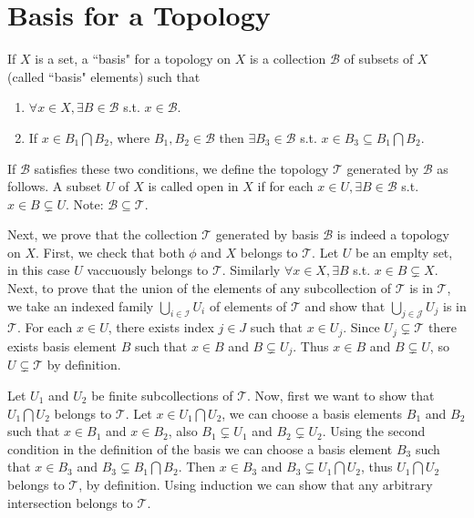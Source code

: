 \documentclass[a4paper,english,12pt]{article}   	%
\begin{document}
\section{Basis for a Topology}
\begin{defn}
 If $X$ is a set, a ``basis" for a topology on $X$ is a collection $\mathcal{B}$ of subsets of $X$ (called ``basis" elements) such that 
 \begin{enumerate}
  \item $\forall x\in X, \exists B\in \mathcal{B}$ s.t. $x\in \mathcal{B}$.
  \item If $x\in B_1\bigcap B_2$, where $B_1, B_2 \in \mathcal{B}$ then $\exists B_3 \in \mathcal{B}$ s.t. $x\in B_3\subseteq B_1\bigcap B_2$.
 \end{enumerate}
\end{defn}
 If $\mathcal{B}$ satisfies these two conditions, we define the topology $\mathcal{T}$ generated by $\mathcal{B}$ as follows. A subset $U$ of $X$ is called open in $X$ if for each $x\in U, \exists B\in \mathcal{B}$ s.t. $x\in B\varsubsetneq U$. 
 Note: $\mathcal{B}\subseteq\mathcal{T}$.
 
 Next, we prove that the collection $\mathcal{T}$ generated by basis $\mathcal{B}$ is indeed a topology on $X$. First, we check that both $\phi$ and $X$ belongs to $\mathcal{T}$. Let $U$ be an emplty set, in this case $U$ vaccuously belongs to $\mathcal{T}$. Similarly $\forall x\in X, \exists B$ s.t. $x\in B\varsubsetneq X$. Next, to prove that the union of the elements of any subcollection of $\mathcal{T}$ is in $\mathcal{T}$, we take an indexed family $\bigcup_{i\in \mathcal{I}}U_i$ of elements of $\mathcal{T}$  and show that $\bigcup_{j\in \mathcal{J}}U_j$ is in $\mathcal{T}$. For each $x\in U$, there exists index $j\in J$ such that $x\in U_j$. Since $U_j \varsubsetneq \mathcal{T}$ there exists basis element $B$ such that $x\in B$ and $B\varsubsetneq U_j$. Thus $x\in B$ and $B\varsubsetneq U$, so $U\varsubsetneq\mathcal{T}$ by definition. 
 
 Let $U_1$ and $U_2$  be finite subcollections of $\mathcal{T}$. Now, first we want to show that $U_1\bigcap U_2 $ belongs to $\mathcal{T}$. Let $x\in U_1\bigcap U_2 $, we can choose a basis elements $B_1$ and $B_2$ such that $x\in B_1$ and $x\in B_2$, also $ B_1\varsubsetneq U_1$ and $B_2\varsubsetneq U_2$. Using the second condition in the definition of the basis we can choose a basis element $B_3$ such that $x\in B_3$ and $B_3\varsubsetneq B_1\bigcap B_2$. Then $x\in B_3$ and $B_3\varsubsetneq U_1\bigcap U_2$, thus $U_1\bigcap U_2$ belongs to $\mathcal{T}$, by definition. Using induction we can show that any arbitrary intersection belongs to $\mathcal{T}$.
\end{document}
